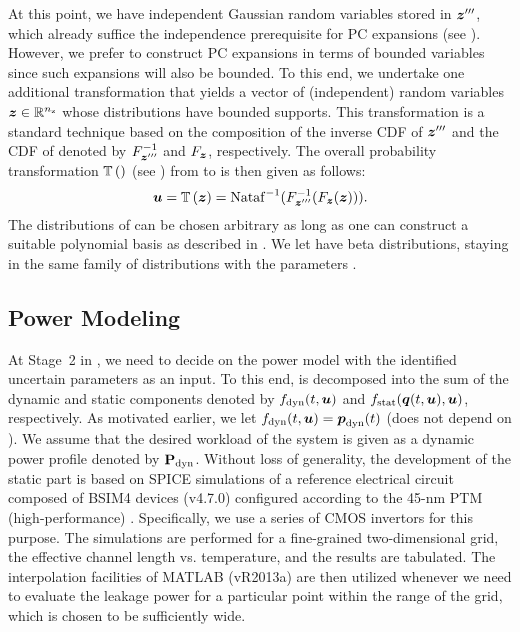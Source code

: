 At this point, we have \nz independent Gaussian random variables stored in
$\boldsymbol{z}'''$, which already suffice the independence prerequisite for PC expansions
(see ). However, we prefer to construct PC expansions
in terms of bounded variables since such expansions will also be bounded. To
this end, we undertake one additional transformation that yields a vector of
(independent) random variables $\boldsymbol{z} \in \mathbb{R}^{n_\mathrm{z}}$ whose distributions have
bounded supports. This transformation is a standard technique based on the
composition of the inverse CDF of $\boldsymbol{z}'''$ and the CDF of \vz denoted by
$F^{-1}_{\boldsymbol{z}'''}$ and $F_{\boldsymbol{z}}$, respectively. The overall probability
transformation $\mathbb{T}\left(\right)$ (see ) from \vu to \vz
is then given as follows:
\[
  \boldsymbol{u} = \mathbb{T}\left(\boldsymbol{z}\right) = \mathrm{Nataf}^{-1}(F^{-1}_{\boldsymbol{z}'''}(F_{\boldsymbol{z}}(\boldsymbol{z}))).
\]
The distributions of \vz can be chosen arbitrary as long as one can construct a
suitable polynomial basis as described in . We let \vz have beta
distributions, staying in the same family of distributions with the parameters
\vu.

\subsection{Power Modeling}

At Stage~2 in , we need to decide on the power model with the
identified uncertain parameters as an input. To this end,  is
decomposed into the sum of the dynamic and static components denoted by
$f_{\mathrm{dyn}}(t, \boldsymbol{u})$ and $f_{\mathrm{stat}}(\boldsymbol{q}(t, \boldsymbol{u}), \boldsymbol{u})$, respectively. As
motivated earlier, we let $f_{\mathrm{dyn}}(t, \boldsymbol{u}) = \boldsymbol{p}_{\mathrm{dyn}}(t)$ (does not
depend on \vu). We assume that the desired workload of the system is given as a
dynamic power profile denoted by $\mathbf{P}_{\mathrm{dyn}}$. Without loss of generality, the
development of the static part is based on SPICE simulations of a reference
electrical circuit composed of BSIM4 devices (v4.7.0) \cite{bsim} configured
according to the 45-nm PTM (high-performance) \cite{ptm}. Specifically, we use a
series of CMOS invertors for this purpose. The simulations are performed for a
fine-grained two-dimensional grid, the effective channel length vs. temperature,
and the results are tabulated. The interpolation facilities of MATLAB (vR2013a)
\cite{matlab} are then utilized whenever we need to evaluate the leakage power
for a particular point within the range of the grid, which is chosen to be
sufficiently wide.


